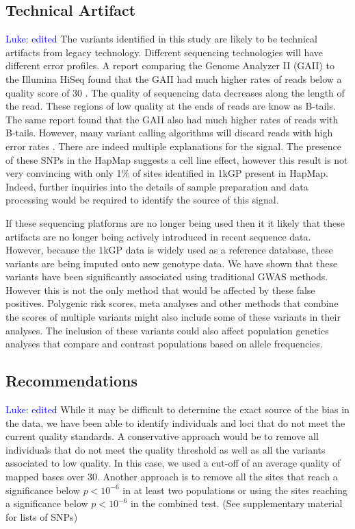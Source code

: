\documentclass[9pt,lineno]{elife}
\newcommand{\luke}[1]{\textcolor{blue}{Luke: #1}}
\begin{document}
\subsection{Technical Artifact}
\luke{edited}
The variants identified in this study are likely to be technical artifacts from legacy technology.
Different sequencing technologies will have different error profiles. 
A report comparing the Genome Analyzer II (GAII) to the Illumina HiSeq found that the GAII had much higher rates of reads below a quality score of 30 \citep{Minoche2011}.
The quality of sequencing data decreases along the length of the read.
These regions of low quality at the ends of reads are know as B-tails.
The same report found that the GAII also had much higher rates of reads with B-tails.
However, many variant calling algorithms will discard reads with high error rates \citep{Minoche2011}.
There are indeed multiple explanations for the signal. 
The presence of these SNPs in the HapMap suggests a cell line effect, however this result is not very convincing with only 1\% of sites identified in 1kGP present in HapMap.
Indeed, further inquiries into the details of sample preparation and data processing would be required to identify the source of this signal. 

If these sequencing platforms are no longer being used then it it likely that these artifacts are no longer being actively introduced in recent sequence data.
However, because the 1kGP data is widely used as a reference database, these variants are being imputed onto new genotype data.
We have shown that these variants have been significantly associated using traditional GWAS methods.
However this is not the only method that would be affected by these false positives. 
Polygenic risk scores, meta analyses and other methods that combine the scores of multiple variants might also include some of these variants in their analyses.
The inclusion of these variants could also affect population genetics analyses that compare and contrast populations based on allele frequencies.


\subsection{Recommendations}
\luke{edited}
While it may be difficult to determine the exact source of the bias in the data, we have been able to identify individuals and loci that do not meet the current quality standards.
A conservative approach would be to remove all individuals that do not meet the quality threshold as well as all the variants associated to low quality.
In this case, we used a cut-off of an average quality of mapped bases over 30.
Another approach is to remove all the sites that reach a significance below $ p < 10^{-6}$ in at least two populations or using the sites reaching a significance below $ p < 10^{-6}$ in the combined test. (See supplementary material for lists of SNPs)
\end{document}
